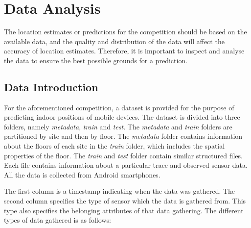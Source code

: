 \section{Data Analysis}\label{sec:data}
The location estimates or predictions for the competition should be based on the available data, and the quality and distribution of the data will affect the accuracy of location estimates. Therefore, it is important to inspect and analyse the data to ensure the best possible grounds for a prediction.

\subsection{Data Introduction} \label{sec:dataset} 
For the aforementioned competition, a dataset is provided for the purpose of predicting indoor positions of mobile devices. The dataset is divided into three folders, namely \textit{metadata}, \textit{train} and \textit{test}. The \textit{metadata} and \textit{train} folders are partitioned by site and then by floor. The \textit{metadata} folder contains information about the floors of each site in the \textit{train} folder, which includes the spatial properties of the floor. The \textit{train} and \textit{test} folder contain similar structured files. Each file contains information about a particular trace and observed sensor data. All the data is collected from Android smartphones.\cite{KaggleData}

The first column is a timestamp indicating when the data was gathered. The second column specifies the type of sensor which the data is gathered from. This type also specifies the belonging attributes of that data gathering. The different types of data gathered is as follows\cite{KaggleDataGithub}:

